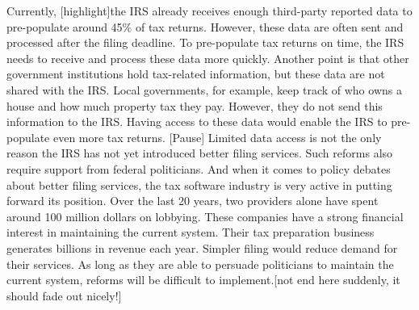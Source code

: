 \documentclass[11pt]{article}
\begin{document}
Currently, [highlight]the IRS already receives enough third-party reported data to pre-populate around 45\% of tax returns. However, these data are often sent and processed after the filing deadline. To pre-populate tax returns on time, the IRS needs to receive and process these data more quickly. Another point is that other government institutions hold tax-related information, but these data are not shared with the IRS. Local governments, for example, keep track of who owns a house and how much property tax they pay. However, they do not send this information to the IRS. Having access to these data would enable the IRS to pre-populate even more tax returns. [Pause] Limited data access is not the only reason the IRS has not yet introduced better filing services. Such reforms also require support from federal politicians. And when it comes to policy debates about better filing services, the tax software industry is very active in putting forward its position. Over the last 20 years, two providers alone have spent around 100 million dollars on lobbying. These companies have a strong financial interest in maintaining the current system. Their tax preparation business generates billions in revenue each year. Simpler filing would reduce demand for their services. As long as they are able to persuade politicians to maintain the current system, reforms will be difficult to implement.[not end here suddenly, it should fade out nicely!]
\end{document}
